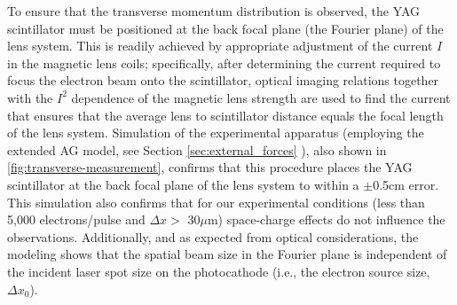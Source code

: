 To ensure that the transverse momentum distribution is observed, the YAG scintillator must be positioned at the back focal plane (the Fourier plane) of the lens system.
This is readily achieved by appropriate adjustment of the current $I$ in the magnetic lens coils; specifically, after determining the current required to focus the electron beam onto the scintillator, optical imaging relations together with the $I^2$ dependence of the magnetic lens strength are used to find the current that ensures that the average lens to scintillator distance equals the focal length of the lens system.
Simulation of the experimental apparatus (employing the extended AG model, see Section \ref{sec:external_forces} ), also shown in \ref{fig:transverse-measurement}, confirms that this procedure places the YAG scintillator at the back focal plane of the lens system to within a $\pm$0.5cm error.
This simulation also confirms that for our experimental conditions (less than 5,000 electrons/pulse and $\Delta x > $ 30$\mu$m) space-charge effects do not influence the observations.
Additionally, and as expected from optical considerations, the modeling shows that the spatial beam size in the Fourier plane is independent of the incident laser spot size on the photocathode (i.e., the electron source size, $\Delta x_0$). 
